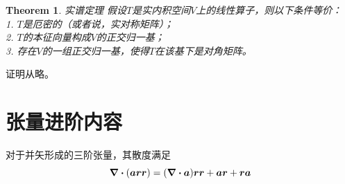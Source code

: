 \documentclass[12pt,a4paper,openany,twoside]{book}
\newtheorem{theorem}{Theorem}[section]
\numberwithin{equation}{section}
\begin{document}
        \begin{theorem} 实谱定理
          假设$T$是实内积空间$V$上的线性算子，则以下条件等价：\\
          1. $T$是厄密的（或者说，实对称矩阵）；\\
          2. $T$的本征向量构成$V$的正交归一基；\\
          3. 存在$V$的一组正交归一基，使得$T$在该基下是对角矩阵。
        \end{theorem}
        证明从略。

      \section{张量进阶内容}
        \label{tensor_higher}
        对于并矢形成的三阶张量，其散度满足
        \begin{equation}
          \div{\qty(\vb*{a}\vb*{r}\vb*{r})} = \qty(\div{\vb*{a}})\vb*{r}\vb*{r} + \vb*{a} \vb*{r}+ \vb*{r}\vb*{a}
        \end{equation}

    
    
  
\end{document}
